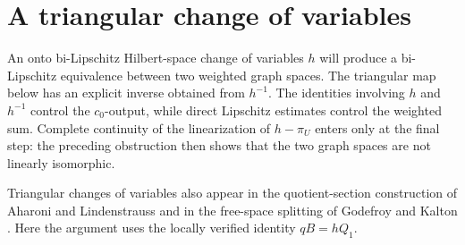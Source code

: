 \section{A triangular change of variables}
\label{sec:triangular}

An onto bi-Lipschitz Hilbert-space change of variables \(h\) will
produce a bi-Lipschitz equivalence between two weighted graph spaces.
The triangular map below has an explicit inverse obtained from
\(h^{-1}\). The identities involving \(h\) and \(h^{-1}\) control
the \(c_0\)-output, while direct Lipschitz estimates control the
weighted sum. Complete continuity of the linearization of
\(h-\pi_U\) enters only at the final step: the preceding obstruction
then shows that the two graph spaces are not linearly isomorphic.

Triangular changes of variables also appear in the quotient-section
construction of Aharoni and Lindenstrauss \cite[pp.~281--282]{AL78}
and in the free-space splitting of Godefroy and Kalton
\cite[Theorem~2.12]{GK03}. Here the argument uses the locally
verified identity \(qB=hQ_1\).



